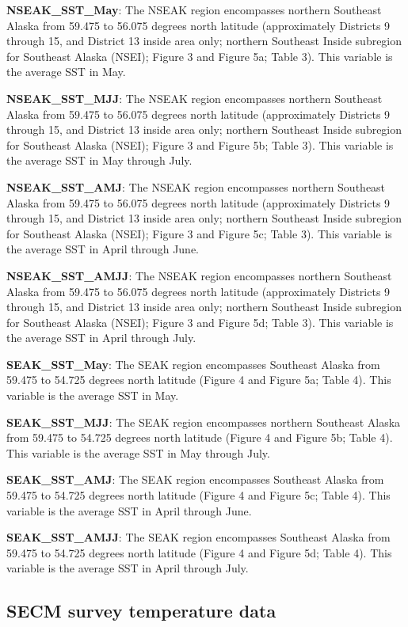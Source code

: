 \documentclass[
]{article}
\begin{document}
\textbf{NSEAK\_SST\_May}: The NSEAK region encompasses northern
Southeast Alaska from 59.475 to 56.075 degrees north latitude
(approximately Districts 9 through 15, and District 13 inside area only;
northern Southeast Inside subregion for Southeast Alaska (NSEI); Figure
3 and Figure 5a; Table 3). This variable is the average SST in May.

\textbf{NSEAK\_SST\_MJJ}: The NSEAK region encompasses northern
Southeast Alaska from 59.475 to 56.075 degrees north latitude
(approximately Districts 9 through 15, and District 13 inside area only;
northern Southeast Inside subregion for Southeast Alaska (NSEI); Figure
3 and Figure 5b; Table 3). This variable is the average SST in May
through July.

\textbf{NSEAK\_SST\_AMJ}: The NSEAK region encompasses northern
Southeast Alaska from 59.475 to 56.075 degrees north latitude
(approximately Districts 9 through 15, and District 13 inside area only;
northern Southeast Inside subregion for Southeast Alaska (NSEI); Figure
3 and Figure 5c; Table 3). This variable is the average SST in April
through June.

\textbf{NSEAK\_SST\_AMJJ}: The NSEAK region encompasses northern
Southeast Alaska from 59.475 to 56.075 degrees north latitude
(approximately Districts 9 through 15, and District 13 inside area only;
northern Southeast Inside subregion for Southeast Alaska (NSEI); Figure
3 and Figure 5d; Table 3). This variable is the average SST in April
through July.

\textbf{SEAK\_SST\_May}: The SEAK region encompasses Southeast Alaska
from 59.475 to 54.725 degrees north latitude (Figure 4 and Figure 5a;
Table 4). This variable is the average SST in May.

\textbf{SEAK\_SST\_MJJ}: The SEAK region encompasses northern Southeast
Alaska from 59.475 to 54.725 degrees north latitude (Figure 4 and Figure
5b; Table 4). This variable is the average SST in May through July.

\textbf{SEAK\_SST\_AMJ}: The SEAK region encompasses Southeast Alaska
from 59.475 to 54.725 degrees north latitude (Figure 4 and Figure 5c;
Table 4). This variable is the average SST in April through June.

\textbf{SEAK\_SST\_AMJJ}: The SEAK region encompasses Southeast Alaska
from 59.475 to 54.725 degrees north latitude (Figure 4 and Figure 5d;
Table 4). This variable is the average SST in April through July.

\subsection{SECM survey temperature
data}\label{secm-survey-temperature-data}
\end{document}
